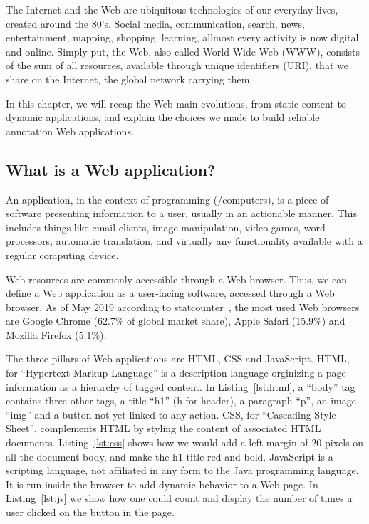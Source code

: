 The Internet and the Web are ubiquitous technologies of our everyday lives,
created around the 80's.
Social media, communication, search, news, entertainment, mapping,
shopping, learning, allmost every activity is now digital and online.
Simply put, the Web, also called World Wide Web (WWW), consists of the sum of all resources,
available through unique identifiers (URI), that we share on the Internet,
the global network carrying them.

In this chapter, we will recap the Web main evolutions,
from static content to dynamic applications,
and explain the choices we made to build reliable annotation Web applications.

\subsection{What is a Web application?}%
\label{sub:web_application}

An application, in the context of programming (/computers),
is a piece of software presenting information to a user,
usually in an actionable manner.
This includes things like email clients, image manipulation, video games,
word processors, automatic translation, and virtually any functionality
available with a regular computing device.

Web resources are commonly accessible through a Web browser.
Thus, we can define a Web application as a user-facing software,
accessed through a Web browser.
As of May 2019 according to statcounter~\cite{browser-market-share},
the most used Web browsers are Google Chrome (62.7\% of global market share),
Apple Safari (15.9\%) and Mozilla Firefox (5.1\%).

The three pillars of Web applications are HTML, CSS and JavaScript.
HTML, for ``Hypertext Markup Language'' is a description language
orginizing a page information as a hierarchy of tagged content.
In Listing~\ref{lst:html}, a ``body'' tag contains three other tags,
a title ``h1'' (h for header), a paragraph ``p'', an image ``img''
and a button not yet linked to any action.
CSS, for ``Cascading Style Sheet'', complements HTML by styling
the content of associated HTML documents.
Listing~\ref{lst:css} shows how we would add a left margin of 20 pixels
on all the document body, and make the h1 title red and bold.
JavaScript is a scripting language, not affiliated in any form
to the Java programming language.
It is run inside the browser to add dynamic behavior to a Web page.
In Listing~\ref{lst:js} we show how one could count and display
the number of times a user clicked on the button in the page.

